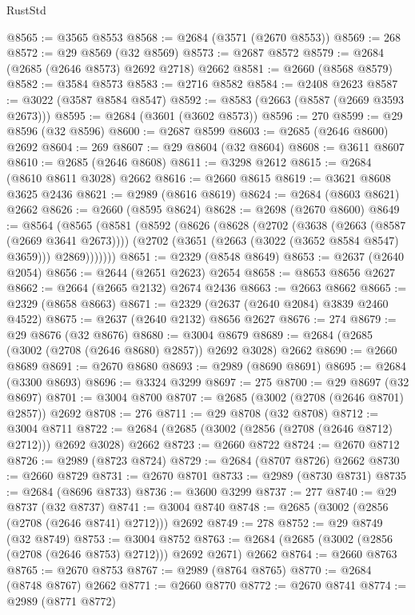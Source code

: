 \begin{lexlean}{RustStd}
\begin{coremodule}
@8565 := @3565 @8553
@8568 := @2684 (@3571 (@2670 @8553))
@8569 := 268
@8572 := @29 @8569 (@32 @8569)
@8573 := @2687 @8572
@8579 := @2684 (@2685 (@2646 @8573) @2692 @2718) @2662
@8581 := @2660 (@8568 @8579)
@8582 := @3584 @8573
@8583 := @2716 @8582
@8584 := @2408 @2623
@8587 := @3022 (@3587 @8584 @8547)
@8592 := @8583 (@2663 (@8587 (@2669 @3593 @2673)))
@8595 := @2684 (@3601 (@3602 @8573))
@8596 := 270
@8599 := @29 @8596 (@32 @8596)
@8600 := @2687 @8599
@8603 := @2685 (@2646 @8600) @2692
@8604 := 269
@8607 := @29 @8604 (@32 @8604)
@8608 := @3611 @8607
@8610 := @2685 (@2646 @8608)
@8611 := @3298 @2612
@8615 := @2684 (@8610 @8611 @3028) @2662
@8616 := @2660 @8615
@8619 := @3621 @8608 @3625 @2436
@8621 := @2989 (@8616 @8619)
@8624 := @2684 (@8603 @8621) @2662
@8626 := @2660 (@8595 @8624)
@8628 := @2698 (@2670 @8600)
@8649 := @8564
    (@8565
      (@8581
        (@8592
          (@8626
            (@8628
              (@2702
                (@3638 (@2663 (@8587 (@2669 @3641 @2673))))
                (@2702 (@3651 (@2663 (@3022 (@3652 @8584 @8547) @3659))) @2869)))))))
@8651 := @2329 (@8548 @8649)
@8653 := @2637 (@2640 @2054)
@8656 := @2644 (@2651 @2623) @2654
@8658 := @8653 @8656 @2627
@8662 := @2664 (@2665 @2132) @2674 @2436
@8663 := @2663 @8662
@8665 := @2329 (@8658 @8663)
@8671 := @2329 (@2637 (@2640 @2084) @3839 @2460 @4522)
@8675 := @2637 (@2640 @2132) @8656 @2627
@8676 := 274
@8679 := @29 @8676 (@32 @8676)
@8680 := @3004 @8679
@8689 := @2684 (@2685 (@3002 (@2708 (@2646 @8680) @2857)) @2692 @3028) @2662
@8690 := @2660 @8689
@8691 := @2670 @8680
@8693 := @2989 (@8690 @8691)
@8695 := @2684 (@3300 @8693)
@8696 := @3324 @3299
@8697 := 275
@8700 := @29 @8697 (@32 @8697)
@8701 := @3004 @8700
@8707 := @2685 (@3002 (@2708 (@2646 @8701) @2857)) @2692
@8708 := 276
@8711 := @29 @8708 (@32 @8708)
@8712 := @3004 @8711
@8722 := @2684 (@2685 (@3002 (@2856 (@2708 (@2646 @8712) @2712))) @2692 @3028) @2662
@8723 := @2660 @8722
@8724 := @2670 @8712
@8726 := @2989 (@8723 @8724)
@8729 := @2684 (@8707 @8726) @2662
@8730 := @2660 @8729
@8731 := @2670 @8701
@8733 := @2989 (@8730 @8731)
@8735 := @2684 (@8696 @8733)
@8736 := @3600 @3299
@8737 := 277
@8740 := @29 @8737 (@32 @8737)
@8741 := @3004 @8740
@8748 := @2685 (@3002 (@2856 (@2708 (@2646 @8741) @2712))) @2692
@8749 := 278
@8752 := @29 @8749 (@32 @8749)
@8753 := @3004 @8752
@8763 := @2684 (@2685 (@3002 (@2856 (@2708 (@2646 @8753) @2712))) @2692 @2671) @2662
@8764 := @2660 @8763
@8765 := @2670 @8753
@8767 := @2989 (@8764 @8765)
@8770 := @2684 (@8748 @8767) @2662
@8771 := @2660 @8770
@8772 := @2670 @8741
@8774 := @2989 (@8771 @8772)

\end{coremodule}
\end{lexlean}

